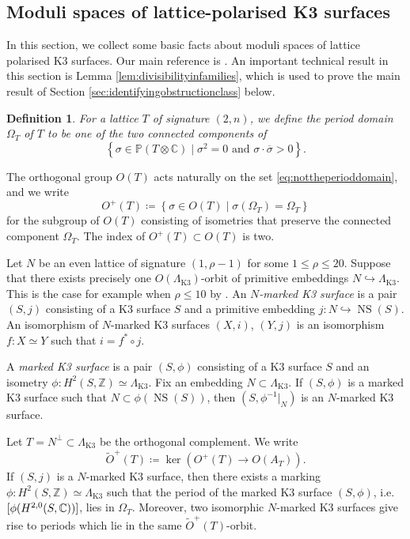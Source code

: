 \documentclass[11pt,twoside]{amsart}
\numberwithin{equation}{section}
\newtheorem{definition}[dummy]{Definition}
\theoremstyle{definition}
\theoremstyle{plain}
\newcommand{\Z}{\ensuremath{\mathbb{Z}}}
\newcommand{\CC}{\ensuremath{\mathbb{C}}}
\newcommand{\PP}{\ensuremath{\mathbb{P}}}
\newcommand{\klat}{\ensuremath{\Lambda_{\operatorname{K3}}}}
\def\NS{\operatorname{NS}}
\def\toplus{\ensuremath{\tilde{O}^+}}
\begin{document}
\subsection{Moduli spaces of lattice-polarised K3 surfaces}
In this section, we collect some basic facts about moduli spaces of lattice polarised K3 surfaces. Our main reference is \cite{Dol95}. An important technical result in this section is Lemma \ref{lem:divisibilityinfamilies}, which is used to prove the main result of Section \ref{sec:identifyingobstructionclass} below. 

\begin{definition}
    For a lattice $T$ of signature $(2,n)$, we define the period domain $\Omega_T$ of $T$ to be one of the two connected components of 
    \begin{equation}\label{eq:nottheperioddomain}
    \left\{\sigma\in \PP(T\otimes \CC)\mid \sigma^2 = 0 \text{ and } \sigma\cdot\overline{\sigma}>0\right\}.
    \end{equation}
\end{definition}

The orthogonal group $O(T)$ acts naturally on the set \eqref{eq:nottheperioddomain}, and we write $$O^+(T)\coloneqq \left\{\sigma\in O(T)\mid \sigma(\Omega_T) = \Omega_T\right\}$$ for the subgroup of $O(T)$ consisting of isometries that preserve the connected component $\Omega_T$. The index of $O^+(T)\subset O(T)$ is two.

Let $N$ be an even lattice of signature $(1,\rho-1)$ for some $1\leq \rho \leq 20$. Suppose that there exists precisely one $O(\klat)$-orbit of primitive embeddings $N\hookrightarrow \klat$. This is the case for example when $\rho\leq 10$ by \cite[Theorem 1.14.4]{Nik80}.
An \textit{$N$-marked K3 surface} is a pair $(S,j)$ consisting of a K3 surface $S$ and a primitive embedding $j:N\hookrightarrow \NS(S)$. 
An isomorphism of $N$-marked K3 surfaces $(X,i)$, $(Y,j)$ is an isomorphism $f: X\simeq Y$ such that $i = f^*\circ j$.

A \textit{marked K3 surface} is a pair $(S,\phi)$ consisting of a K3 surface $S$ and an isometry $\phi: H^2(S,\Z)\simeq \klat$. Fix an embedding $N\subset \klat$. If $(S,\phi)$ is a marked K3 surface such that $N\subset \phi(\NS(S))$, then $(S,\phi^{-1}|_N)$ is an $N$-marked K3 surface.


Let $T = N^\perp\subset \klat$ be the orthogonal complement. We write $$\toplus(T)\coloneqq \ker\left(O^+(T)\to O(A_T)\right).$$ If $(S,j)$ is a $N$-marked K3 surface, then there exists a marking $\phi: H^2(S,\Z)\simeq \klat$ such that the period of the marked K3 surface $(S,\phi)$, i.e. $[\phi(H^{2,0}(S,\mathbb{C}))]$, lies in $\Omega_T$. Moreover, two isomorphic $N$-marked K3 surfaces give rise to periods which lie in the same $\toplus(T)$-orbit.
\end{document}
